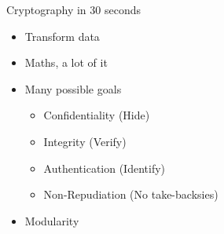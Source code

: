 \documentclass[10pt, compress]{beamer}
\begin{document}
\begin{frame}{Cryptography in 30 seconds}

 \begin{itemize}
  \item Transform data
  \item Maths, a lot of it
  \item Many possible goals
    \begin{itemize}
  	\item Confidentiality (Hide)
  	\item Integrity (Verify)
  	\item Authentication (Identify)
  	\item Non-Repudiation (No take-backsies)
    \end{itemize}  
  \item Modularity
  \end{itemize}    

\end{frame}
\end{document}
